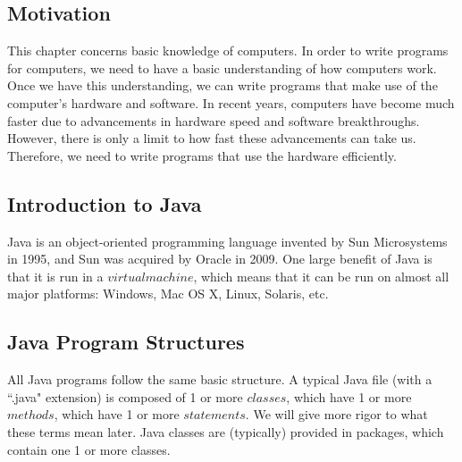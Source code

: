 %
\subsection{Motivation}
This chapter concerns basic knowledge of computers. In order to write programs for computers, we need to have a basic understanding of how computers work. Once we have this understanding, we can write programs that make use of the computer's hardware and software. In recent years, computers have become much faster due to advancements in hardware speed and software breakthroughs. However, there is only a limit to how fast these advancements can take us. Therefore, we need to write programs that use the hardware efficiently.

\subsection{Introduction to Java}
Java is an object-oriented programming language invented by Sun Microsystems in 1995, and Sun was acquired by Oracle in 2009. One large benefit of Java is that it is run in a $virtual machine$, which means that it can be run on almost all major platforms: Windows, Mac OS X, Linux, Solaris, etc. 

\subsection{Java Program Structures}
All Java programs follow the same basic structure. A typical Java file (with a ``.java" extension) is composed of 1 or more $classes$, which have 1 or more $methods$, which have 1 or more $statements$. We will give more rigor to what these terms mean later. Java classes are (typically) provided in packages, which contain one 1 or more classes.

